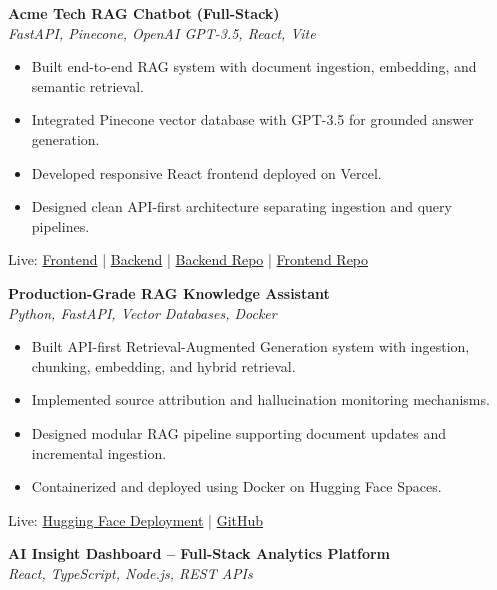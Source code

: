 \documentclass[letterpaper,11pt]{article}
\begin{document}
\textbf{Acme Tech RAG Chatbot (Full-Stack)} \\
\textit{FastAPI, Pinecone, OpenAI GPT-3.5, React, Vite}

\begin{itemize}
\item Built end-to-end RAG system with document ingestion, embedding, and semantic retrieval.
\item Integrated Pinecone vector database with GPT-3.5 for grounded answer generation.
\item Developed responsive React frontend deployed on Vercel.
\item Designed clean API-first architecture separating ingestion and query pipelines.
\end{itemize}

Live: \href{https://ragbot-frontend.vercel.app}{Frontend} \quad | \quad
\href{https://ragbot-production-6b35.up.railway.app}{Backend} \quad | \quad
\href{https://github.com/Ujjuanku/ragbot}{Backend Repo} \quad | \quad
\href{https://github.com/Ujjuanku/ragbot_frontend}{Frontend Repo}

\vspace{8pt}

\textbf{Production-Grade RAG Knowledge Assistant} \\
\textit{Python, FastAPI, Vector Databases, Docker}

\begin{itemize}
\item Built API-first Retrieval-Augmented Generation system with ingestion, chunking, embedding, and hybrid retrieval.
\item Implemented source attribution and hallucination monitoring mechanisms.
\item Designed modular RAG pipeline supporting document updates and incremental ingestion.
\item Containerized and deployed using Docker on Hugging Face Spaces.
\end{itemize}

Live: \href{https://huggingface.co/spaces}{Hugging Face Deployment} \quad | \quad
\href{https://github.com/Ujjuanku}{GitHub}

\vspace{8pt}

\textbf{AI Insight Dashboard – Full-Stack Analytics Platform} \\
\textit{React, TypeScript, Node.js, REST APIs}
\end{document}
